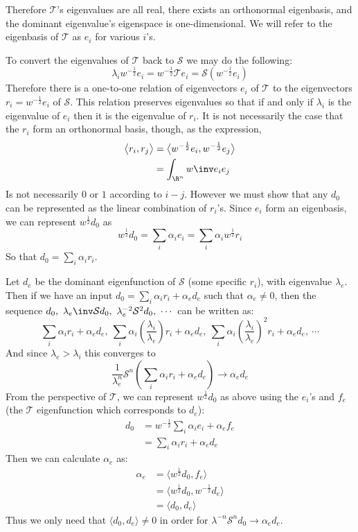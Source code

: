 \documentclass{article}
\begin{document}
Therefore $\mathcal T$'s eigenvalues are all real, there exists an orthonormal eigenbasis, and the dominant eigenvalue's eigenspace is one-dimensional. We will refer to the eigenbasis of $\mathcal T$ as $e_i$ for various $i$'s.

To convert the eigenvalues of $\mathcal T$ back to $\mathcal S$ we may do the following:
$$\lambda_iw^{-\frac12}e_i=w^{-\frac12}\mathcal Te_i=\mathcal S\left(w^{-\frac12}e_i\right)$$
Therefore there is a one-to-one relation of eigenvectors $e_i$ of $\mathcal T$ to the eigenvectors $r_i=w^{-\frac12}e_i$ of $\mathcal S$. This relation preserves eigenvalues so that if and only if $\lambda_i$ is the eigenvalue of $e_i$ then it is the eigenvalue of $r_i$. It is not necessarily the case that the $r_i$ form an orthonormal basis, though, as the expression,
\begin{align*}
    \big\langle r_i,r_j\big\rangle&=\big\langle w^{-\frac12}e_i,w^{-\frac12}e_j\big\rangle \\
    &=\int_{\R^n}w\inv e_ie_j
\end{align*}
Is not necessarily $0$ or $1$ according to $i-j$. However we must show that any $d_0$ can be represented as the linear combination of $r_i$'s. Since $e_i$ form an eigenbasis, we can represent $w^{\frac12}d_0$ as
$$w^{\frac12}d_0=\sum_i\alpha_ie_i=\sum_i\alpha_iw^{\frac12}r_i$$
So that $d_0=\sum_i\alpha_ir_i$.

Let $d_e$ be the dominant eigenfunction of $\mathcal S$ (some specific $r_i$), with eigenvalue $\lambda_e$. Then if we have an input $d_0=\sum_i\alpha_ir_i+\alpha_ed_e$ such that $\alpha_e\ne0$, then the sequence $d_0,\ \lambda_e\inv\mathcal Sd_0,\ \lambda_e^{-2}\mathcal S^2d_0,\ \cdots$ can be written as:
$$\sum_i\alpha_ir_i+\alpha_ed_e,\ \sum_i\alpha_i\left(\frac{\lambda_i}{\lambda_e}\right)r_i+\alpha_ed_e,\ \sum_i\alpha_i\left(\frac{\lambda_i}{\lambda_e}\right)^2r_i+\alpha_ed_e,\ \cdots$$
And since $\lambda_e>\lambda_i$ this converges to
$$\frac1{\lambda_e^n}\mathcal S^n\left(\sum_i\alpha_ir_i+\alpha_ed_e\right)\to \alpha_ed_e$$
From the perspective of $\mathcal T$, we can represent $w^\frac12d_0$ as above using the $e_i$'s and $f_e$ (the $\mathcal T$ eigenfunction which corresponds to $d_e$):
\begin{align*}
    d_0&=w^{-\frac12}\sum_i\alpha_ie_i+\alpha_ef_e \\
    &=\sum_i\alpha_ir_i+\alpha_ed_e
\end{align*}
Then we can calculate $\alpha_e$ as:
\begin{align*}
    \alpha_e&=\big\langle w^\frac12d_0,f_e\big\rangle \\
    &=\big\langle w^\frac12d_0,w^{-\frac12}d_e\big\rangle \\
    &=\big\langle d_0,d_e\big\rangle
\end{align*}
Thus we only need that $\big\langle d_0,d_e\big\rangle\ne0$ in order for $\lambda^{-n}\mathcal S^nd_0\to\alpha_ed_e$. 
\end{document}
